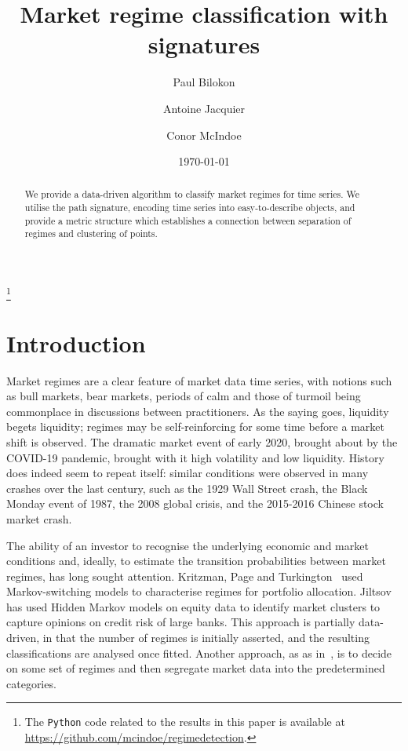 \documentclass{amsart}[11pt]
\numberwithin{equation}{section}
\theoremstyle{definition}
\begin{document}
\title{Market regime classification with signatures}
\author{Paul Bilokon}
\address{The Thalesians and Department of Mathematics, Imperial College London}
\author{Antoine Jacquier}
\address{Department of Mathematics, Imperial College London and the Alan Turing Institute}
\author{Conor McIndoe}
\address{Department of Mathematics, Imperial College London}
\thanks{
The \texttt{Python} code related to the results in this paper is available at
\href{https://github.com/mcindoe/regimedetection}{https://github.com/mcindoe/regimedetection}.}
\date{\today}
\maketitle


\begin{abstract}
We provide a data-driven algorithm to classify market regimes for time series. 
We utilise the path signature, encoding time series into easy-to-describe objects, and provide a metric structure which establishes a connection between separation of regimes and clustering of points.
\end{abstract}


\section{Introduction}

Market regimes are a clear feature of market data time series, with notions such as bull markets, bear markets, periods of calm and those of turmoil being commonplace in discussions between practitioners. As the saying goes, liquidity begets liquidity; regimes may be self-reinforcing for some time before a market shift is observed.
The dramatic market event of early 2020, brought about by the COVID-19 pandemic, brought with it high volatility and low liquidity. History does indeed seem to repeat itself: similar conditions were observed in many crashes over the last century, such as the 1929 Wall Street crash, the Black Monday event of 1987, the 2008 global crisis, and the 2015-2016 Chinese stock market crash.

The ability of an investor to recognise the underlying economic and market conditions and, ideally, to estimate the transition probabilities between market regimes, has long sought attention.
Kritzman, Page and Turkington~\cite{Kritzman12} used Markov-switching models to characterise regimes for portfolio allocation.
Jiltsov~\cite{Jiltsov20} has used Hidden Markov models on equity data to identify market clusters to capture opinions on credit risk of large banks.
This approach is partially data-driven, in that the number of regimes is initially asserted, and the resulting classifications are analysed once fitted.
Another approach, as as in~\cite{Nystrup20}, is to decide on some set of regimes and then segregate market data into the predetermined categories.
\end{document}
